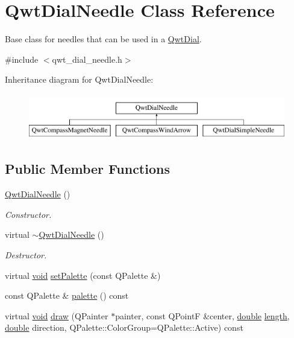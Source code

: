 \hypertarget{class_qwt_dial_needle}{\section{Qwt\-Dial\-Needle Class Reference}
\label{class_qwt_dial_needle}
}


Base class for needles that can be used in a \hyperlink{class_qwt_dial}{Qwt\-Dial}.  




{\ttfamily \#include $<$qwt\-\_\-dial\-\_\-needle.\-h$>$}

Inheritance diagram for Qwt\-Dial\-Needle\-:\begin{figure}[H]
\begin{center}
\leavevmode
\includegraphics[height=2.000000cm]{class_qwt_dial_needle}
\end{center}
\end{figure}
\subsection*{Public Member Functions}
\begin{DoxyCompactItemize}
\item 
\hyperlink{class_qwt_dial_needle_aef3af79632ce784bc4d7332f6e269a1f}{Qwt\-Dial\-Needle} ()
\begin{DoxyCompactList}\small\item\em Constructor. \end{DoxyCompactList}\item 
virtual \hyperlink{class_qwt_dial_needle_ac23b2af4af50042967c8cea87b474247}{$\sim$\-Qwt\-Dial\-Needle} ()
\begin{DoxyCompactList}\small\item\em Destructor. \end{DoxyCompactList}\item 
virtual \hyperlink{group___u_a_v_objects_plugin_ga444cf2ff3f0ecbe028adce838d373f5c}{void} \hyperlink{class_qwt_dial_needle_ae850883a64501136bca64d6ea2d084b9}{set\-Palette} (const Q\-Palette \&)
\item 
const Q\-Palette \& \hyperlink{class_qwt_dial_needle_a8b3c915032389261e07cc983b433166c}{palette} () const 
\item 
virtual \hyperlink{group___u_a_v_objects_plugin_ga444cf2ff3f0ecbe028adce838d373f5c}{void} \hyperlink{class_qwt_dial_needle_a425085086c4a8c7baff10b161616ee42}{draw} (Q\-Painter $\ast$painter, const Q\-Point\-F \&center, \hyperlink{_super_l_u_support_8h_a8956b2b9f49bf918deed98379d159ca7}{double} \hyperlink{glext_8h_a3c8469415bbc83dd1341af15c67f1cef}{length}, \hyperlink{_super_l_u_support_8h_a8956b2b9f49bf918deed98379d159ca7}{double} direction, Q\-Palette\-::\-Color\-Group=Q\-Palette\-::\-Active) const 
\end{DoxyCompactItemize}
